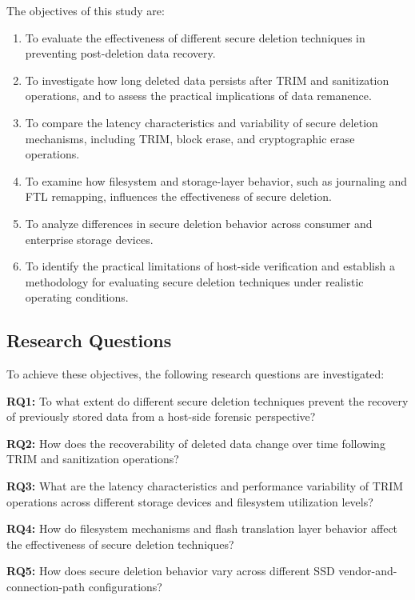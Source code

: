The objectives of this study are:

\begin{enumerate}
    \item To evaluate the effectiveness of different secure deletion techniques in preventing post-deletion data recovery.
    \item To investigate how long deleted data persists after TRIM and sanitization operations, and to assess the practical implications 
    of data remanence.
    \item To compare the latency characteristics and variability of secure deletion mechanisms, including TRIM, block erase, and 
    cryptographic erase operations.
    \item To examine how filesystem and storage-layer behavior, such as journaling and FTL remapping, influences the effectiveness of 
    secure deletion.
    \item To analyze differences in secure deletion behavior across consumer and enterprise storage devices.
    \item To identify the practical limitations of host-side verification and establish a methodology for evaluating secure deletion techniques 
    under realistic operating conditions.

\end{enumerate}

\subsection{Research Questions}

To achieve these objectives, the following research questions are investigated:

\textbf{RQ1:} To what extent do different secure deletion techniques prevent the recovery of previously stored data from a host-side forensic 
perspective?

\textbf{RQ2:} How does the recoverability of deleted data change over time following TRIM and sanitization operations?

\textbf{RQ3:} What are the latency characteristics and performance variability of TRIM operations across different storage devices and 
filesystem utilization levels?

\textbf{RQ4:} How do filesystem mechanisms and flash translation layer behavior affect the effectiveness of secure deletion techniques?

\textbf{RQ5:} How does secure deletion behavior vary across different SSD vendor-and-connection-path configurations?

